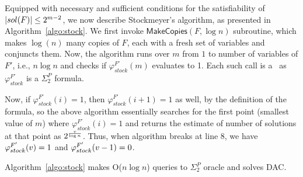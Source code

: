 Equipped with necessary and sufficient conditions for the satisfiability of $|sol({F})|\leq 2^{m-2}$, we now describe Stockmeyer's algorithm, as presented in Algorithm~\ref{algo:stock}.
We first invoke  
$\mathsf{MakeCopies}(F,\log n)$ subroutine, which makes $\log(n)$ many copies of $F$, each with a fresh set of variables and conjuncts them.
Now, the algorithm runs over $m$ from $1$ to number of variables of $F'$, i.e., $n\log n$ and checks if $\varphi_{stock}^{F'}(m)$ evaluates to 1. Each such call is a \twoqbfcheck\  as $\varphi_{stock}^{F'}$ is a $\Sigma_2^P$ formula.

Now, if $\varphi_{stock}^{F'}(i)=1$, then $\varphi_{stock}^{F'}(i+1)=1$ as well, by the definition of the formula, so the above algorithm essentially searches for the first point (smallest value of $m$) where $\varphi_{stock}^{F'}(i)=1$ and returns the estimate of number of solutions at that point as $2^{\frac{v}{\log n}}$. Thus, when algorithm breaks at line 8, we have $\varphi_{stock}^{F'}(v)=1$ and $\varphi_{stock}^{F'}(v-1)=0$.

 
\begin{theorem}[Stockmeyer]
	Algorithm~\ref{algo:stock} makes O($n \log n$) queries to $\Sigma_2^P$ oracle and solves DAC. 
\end{theorem}

